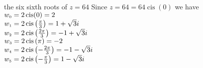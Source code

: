 { the six sixth roots of $z = 64$}
{ Since $z = 64 = 64\operatorname{cis}(0)$ we have \\$w_{\text{\tiny$0$}} = 2\operatorname{cis}(0) = 2$\\$w_{\text{\tiny$1$}} = 2\operatorname{cis}\left(\frac{\pi}{3}\right) = 1 + \sqrt{3}i$\\$w_{\text{\tiny$2$}} = 2\operatorname{cis}\left(\frac{2\pi}{3}\right) = -1 + \sqrt{3}i$\\$w_{\text{\tiny$3$}} = 2\operatorname{cis}\left(\pi\right) = -2$\\$w_{\text{\tiny$4$}} = 2\operatorname{cis}\left(-\frac{2\pi}{3}\right) = -1 - \sqrt{3}i$\\$w_{\text{\tiny$5$}} = 2\operatorname{cis}\left(-\frac{\pi}{3}\right) = 1 - \sqrt{3}i$}
